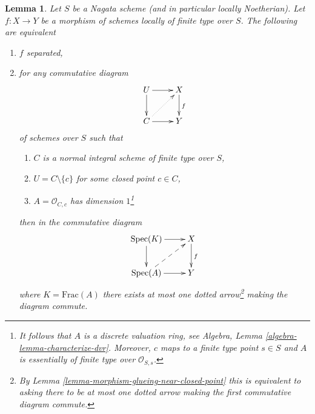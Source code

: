 \documentclass{stacks-project}
\theoremstyle{plain}
\newtheorem{lemma}[subsection]{Lemma}
\theoremstyle{definition}
\theoremstyle{remark}
\numberwithin{equation}{subsection}
\def\Spec{\mathop{\mathrm{Spec}}}
\begin{document}
\begin{lemma}
\label{lemma-essentially-finite-type-criterion-separation}
Let $S$ be a Nagata scheme (and in particular locally Noetherian).
Let $f : X \to Y$ be a morphism of schemes locally of finite type over $S$.
The following are equivalent
\begin{enumerate}
\item $f$ separated,
\item for any commutative diagram
$$
\xymatrix{
U \ar[r] \ar[d] & X \ar[d]^f \\
C \ar[r] \ar@{..>}[ru] & Y
}
$$
of schemes over $S$ such that
\begin{enumerate}
\item $C$ is a normal integral scheme of finite type over $S$,
\item $U = C \setminus \{c\}$ for some closed point $c \in C$,
\item $A = \mathcal{O}_{C, c}$ has dimension $1$\footnote{It follows
that $A$ is a discrete valuation ring, see
Algebra, Lemma \ref{algebra-lemma-characterize-dvr}.
Moreover, $c$ maps to a finite type point $s \in S$ and
$A$ is essentially of finite type over $\mathcal{O}_{S, s}$.}
\end{enumerate}
then in the commutative diagram
$$
\xymatrix{
\Spec(K) \ar[r] \ar[d] & X \ar[d]^f \\
\Spec(A) \ar[r] \ar@{-->}[ru] & Y
}
$$
where $K = \text{Frac}(A)$ there exists at most one dotted arrow\footnote{By
Lemma \ref{lemma-morphism-glueing-near-closed-point} this is
equivalent to asking there to be at most one dotted arrow
making the first commutative diagram commute.}
making the diagram commute.
\end{enumerate}
\end{lemma}
\end{document}
